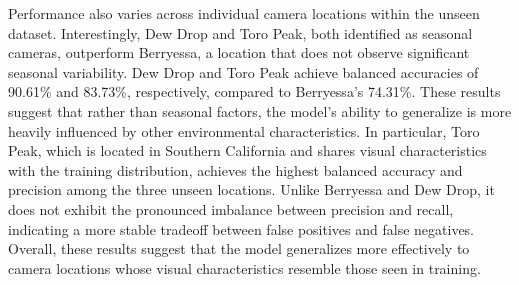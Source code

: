 \documentclass{article}
\begin{document}
Performance also varies across individual camera locations within the unseen dataset. Interestingly, Dew Drop and Toro Peak, both identified as seasonal cameras, outperform Berryessa, a location that does not observe significant seasonal variability. Dew Drop and Toro Peak achieve balanced accuracies of 90.61\% and 83.73\%, respectively, compared to Berryessa's 74.31\%. These results suggest that rather than seasonal factors, the model's ability to generalize is more heavily influenced by other environmental characteristics. In particular, Toro Peak, which is located in Southern California and shares visual characteristics with the training distribution, achieves the highest balanced accuracy and precision among the three unseen locations. Unlike Berryessa and Dew Drop, it does not exhibit the pronounced imbalance between precision and recall, indicating a more stable tradeoff between false positives and false negatives. Overall, these results suggest that the model generalizes more effectively to camera locations whose visual characteristics resemble those seen in training. 
\end{document}
